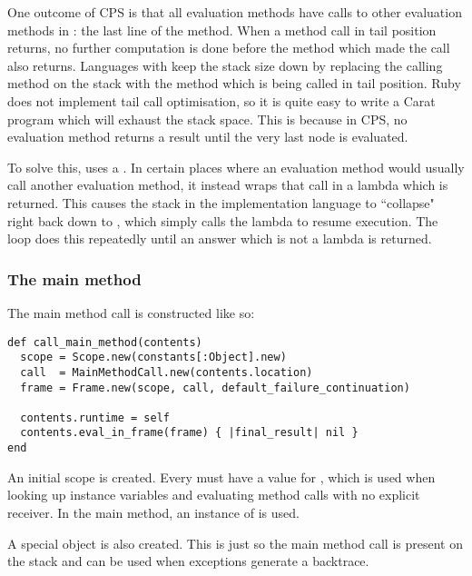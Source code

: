 One outcome of CPS is that all evaluation methods have calls to other evaluation methods in : the last line of the method. When a method call in tail position returns, no further computation is done before the method which made the call also returns. Languages with  keep the stack size down by replacing the calling method on the stack with the method which is being called in tail position. Ruby does not implement tail call optimisation, so it is quite easy to write a Carat program which will exhaust the stack space. This is because in CPS, no evaluation method returns a result until the very last node is evaluated.

To solve this,  uses a . In certain places where an evaluation method would usually call another evaluation method, it instead wraps that call in a lambda which is returned. This causes the stack in the implementation language to ``collapse" right back down to , which simply calls the lambda to resume execution. The  loop does this repeatedly until an answer which is not a lambda is returned.

\subsubsection{The main method}

The main method call is constructed like so:

\begin{minipage}{\textwidth}
\begin{lstlisting}
def call_main_method(contents)
  scope = Scope.new(constants[:Object].new)
  call  = MainMethodCall.new(contents.location)
  frame = Frame.new(scope, call, default_failure_continuation)
  
  contents.runtime = self
  contents.eval_in_frame(frame) { |final_result| nil }
end
\end{lstlisting}
\end{minipage}

An initial scope is created. Every  must have a value for , which is used when looking up instance variables and evaluating method calls with no explicit receiver. In the main method, an instance of  is used.

A special  object is also created. This is just so the main method call is present on the stack and can be used when exceptions generate a backtrace.

